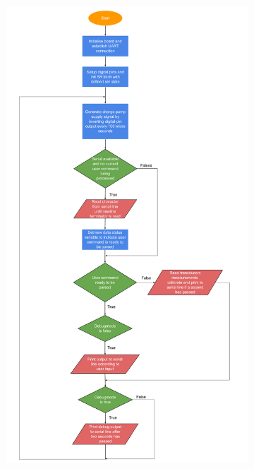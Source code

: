 \begin{figure}[h]
 \footnotesize
 \centering
    \begin{subfigure}[]{0.4\textwidth}
              \centering
  		\includegraphics[width=1\linewidth]{./Figures/arduino_code_flow.pdf}
		    \caption{} \label{subfig:arduino_code_flow}
     \end{subfigure}
          \begin{subfigure}[]{0.4\textwidth}

\end{subfigure}
\end{figure}
